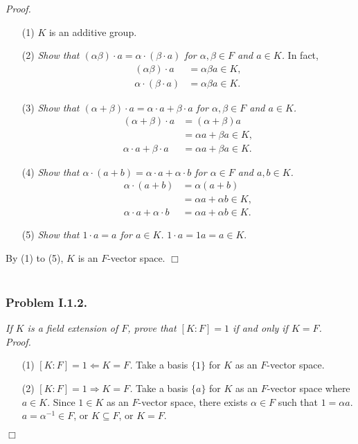 \documentclass{article}
\begin{document}
\emph{Proof.}
\begin{enumerate}
\item[(1)]
$K$ is an additive group.
\item[(2)]
\emph{Show that $(\alpha \beta) \cdot a = \alpha \cdot (\beta \cdot a)$
for $\alpha, \beta \in F$ and $a \in K$.}
In fact,
\begin{align*}
(\alpha \beta) \cdot a
&= \alpha \beta a \in K, \\
\alpha \cdot (\beta \cdot a)
&= \alpha \beta a \in K.
\end{align*}
\item[(3)]
\emph{Show that $(\alpha + \beta) \cdot a = \alpha \cdot a + \beta \cdot a$
for $\alpha, \beta \in F$ and $a \in K$.}
\begin{align*}
(\alpha + \beta) \cdot a
&= (\alpha + \beta) a \\
&= \alpha a + \beta a \in K, \\
\alpha \cdot a + \beta \cdot a
&= \alpha a + \beta a \in K.
\end{align*}
\item[(4)]
\emph{Show that $\alpha \cdot (a + b) = \alpha \cdot a + \alpha \cdot b$
for $\alpha \in F$ and $a, b \in K$.}
\begin{align*}
\alpha \cdot (a + b)
&= \alpha (a + b) \\
&= \alpha a + \alpha b \in K, \\
\alpha \cdot a + \alpha \cdot b
&= \alpha a + \alpha b \in K.
\end{align*}
\item[(5)]
\emph{Show that $1 \cdot a = a$
for $a \in K$.}
$1 \cdot a = 1 a = a \in K$.
\end{enumerate}
By (1) to (5), $K$ is an $F$-vector space.
$\Box$ \\\\






\subsubsection*{Problem I.1.2.}
\emph{If $K$ is a field extension of $F$, prove that $[K:F] = 1$
if and only if $K = F$.} \\

\emph{Proof.}
\begin{enumerate}
\item[(1)]
\emph{$[K:F] = 1 \Longleftarrow K = F$.}
Take a basis $\{1\}$ for $K$ as an $F$-vector space.
\item[(2)]
\emph{$[K:F] = 1 \Longrightarrow K = F$.}
Take a basis $\{a\}$ for $K$ as an $F$-vector space where $a \in K$.
Since $1 \in K$ as an $F$-vector space,
there exists $\alpha \in F$ such that $1 = \alpha a$.
$a = \alpha^{-1} \in F$, or $K \subseteq F$, or $K = F$.
\end{enumerate}
$\Box$ \\\\
\end{document}
